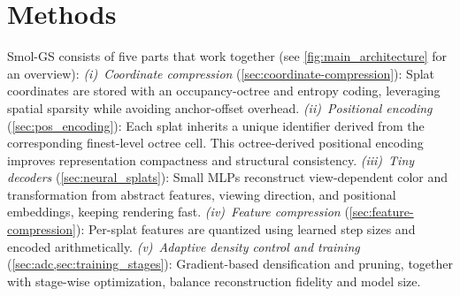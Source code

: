 \documentclass{article}
\newcommand{\ours}{Smol-GS\xspace}
\begin{document}
%



%

%



%
%
%
%
%
%
%
%

%
%
%
%
%
%
%







%
\section{Methods}
\label{sec:methods}
%
%
\ours consists of five parts that work together (see \cref{fig:main_architecture} for an overview):
{\em (i)}~\emph{Coordinate compression} (\cref{sec:coordinate-compression}): Splat coordinates are stored with an occupancy-octree and entropy coding, leveraging spatial sparsity while avoiding anchor-offset overhead. \sloppy 
{\em (ii)}~\emph{Positional encoding} (\cref{sec:pos_encoding}): Each splat inherits a unique identifier derived from the corresponding finest-level octree cell. This octree-derived positional encoding improves representation compactness and structural consistency.
{\em (iii)}~\emph{Tiny decoders} (\cref{sec:neural_splats}): Small MLPs reconstruct view-dependent color and transformation from abstract features, viewing direction, and positional embeddings, keeping rendering fast. 
{\em (iv)}~\emph{Feature compression} (\cref{sec:feature-compression}):
%
Per-splat features are quantized using learned step sizes and encoded arithmetically.
{\em (v)}~\emph{Adaptive density control and training} (\cref{sec:adc,sec:training_stages}): Gradient-based densification and pruning, together with stage-wise optimization, balance reconstruction fidelity and model size.
\end{document}
